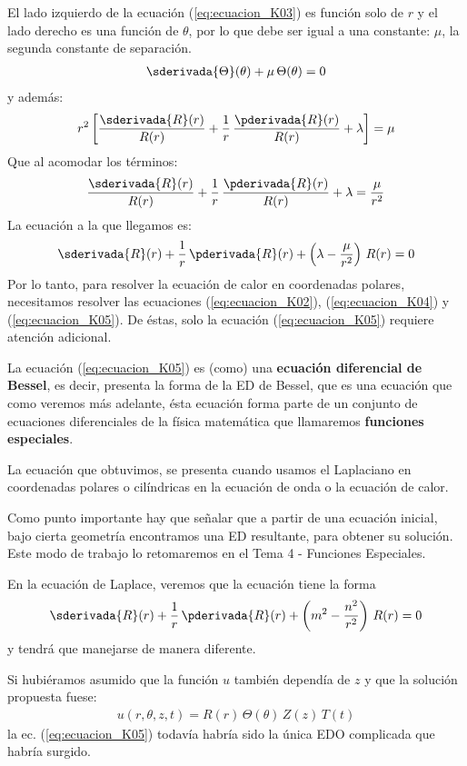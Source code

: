 El lado izquierdo de la ecuación (\ref{eq:ecuacion_K03}) es función solo de $r$ y el lado derecho es una función de $\theta$, por lo que debe ser igual a una constante: $\mu$, la segunda constante de separación.
\begin{align}
\sderivada{\Theta} (\theta) + \mu \, \Theta (\theta) = 0
\label{eq:ecuacion_K04}    
\end{align}
y además:
\begin{align*}
r^{2} \left[ \dfrac{\sderivada{R} (r)}{R (r)} + \dfrac{1}{r} \, \dfrac{\pderivada{R} (r)}{R (r)} + \lambda \right] = \mu
\end{align*}
Que al acomodar los términos:
\begin{align*}
\dfrac{\sderivada{R} (r)}{R (r)} + \dfrac{1}{r} \, \dfrac{\pderivada{R} (r)}{R (r)} + \lambda = \dfrac{\mu}{r^{2}}
\end{align*}
La ecuación a la que llegamos es:
\begin{align}
\sderivada{R} (r) + \dfrac{1}{r} \, \pderivada{R} (r) + \left( \lambda - \dfrac{\mu}{r^{2}} \right) \, R (r) = 0
\label{eq:ecuacion_K05}    
\end{align}
Por lo tanto, para resolver la ecuación de calor en coordenadas polares, necesitamos resolver las ecuaciones (\ref{eq:ecuacion_K02}), (\ref{eq:ecuacion_K04}) y (\ref{eq:ecuacion_K05}). De éstas, solo la ecuación (\ref{eq:ecuacion_K05}) requiere atención adicional.
\par
La ecuación (\ref{eq:ecuacion_K05}) es (como) una \textbf{ecuación diferencial de Bessel}, es decir, presenta la forma de la ED de Bessel, que es una ecuación que como veremos más adelante, ésta ecuación forma parte de un conjunto de ecuaciones diferenciales de la física matemática que llamaremos \textbf{funciones especiales}.
\par
La ecuación que obtuvimos, se presenta cuando usamos el Laplaciano en coordenadas polares o cilíndricas en la ecuación de onda o la ecuación de calor.
\par
Como punto importante hay que señalar que a partir de una ecuación inicial, bajo cierta geometría encontramos una ED resultante, para obtener su solución. Este modo de trabajo lo retomaremos en el Tema 4 - Funciones Especiales.
\par
En la ecuación de Laplace, veremos que la ecuación tiene la forma
\begin{align*}
\sderivada{R} (r) + \dfrac{1}{r} \, \pderivada{R} (r) + \left( m^{2} - \dfrac{n^{2}}{r^{2}} \right) \, R(r) = 0
\end{align*}
y tendrá que manejarse de manera diferente.
\par
Si hubiéramos asumido que la función $u$ también dependía de $z$ y que la solución propuesta fuese:
\begin{align*}
u (r, \theta, z, t) =  R (r) \, \Theta (\theta) \, Z (z) \, T (t) 
\end{align*}
la ec. (\ref{eq:ecuacion_K05}) todavía habría sido la única EDO complicada que habría surgido.

